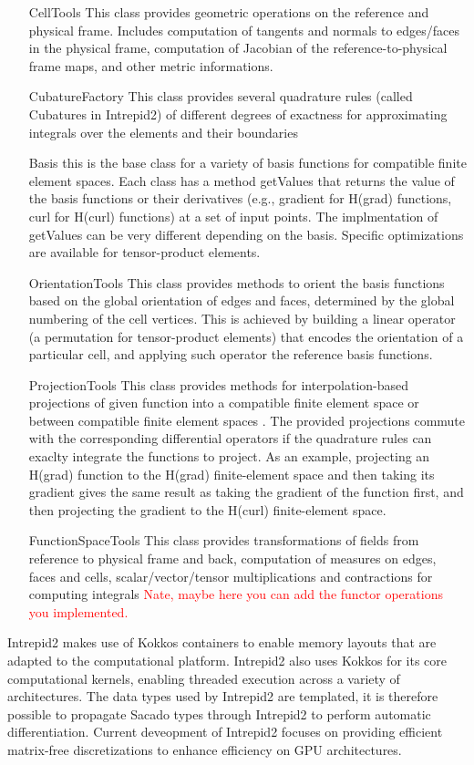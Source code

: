 \begin{itemize}
\item[CellTools] This class provides geometric operations on the reference and physical frame. Includes computation of tangents and normals to edges/faces in the physical frame, computation of Jacobian of the reference-to-physical frame maps, and other metric informations. 
\item[CubatureFactory] This class provides several quadrature rules (called Cubatures in Intrepid2) of different degrees of exactness for approximating integrals over the elements and their boundaries
\item[Basis] this is the base class for a variety of basis functions for compatible finite element spaces. Each class has a method getValues that returns the value of the basis functions or their derivatives (e.g., gradient for H(grad) functions, curl for H(curl) functions) at a set of input  points. The implmentation of getValues can be very different depending on the basis. Specific optimizations are available for tensor-product elements.
\item[OrientationTools] This class provides methods to orient the basis functions based on the global orientation of edges and faces, determined by the global numbering of the cell vertices. This is achieved by building a linear operator (a permutation for tensor-product elements) that encodes the orientation of a particular cell, and applying such operator the reference basis functions.
\item[ProjectionTools] This class provides methods for interpolation-based projections of given function into a compatible finite element space or between compatible finite element spaces \cite{demkowicz2007}.  The provided projections commute with the corresponding differential operators if the quadrature rules can exaclty integrate the functions to project. As an example, projecting an H(grad) function to the H(grad) finite-element space and then taking its gradient gives the same result as taking the gradient of the function first, and then projecting the gradient to the H(curl) finite-element space.
\item[FunctionSpaceTools] This class provides transformations of fields from reference to physical frame and back, computation of measures on edges, faces and cells, scalar/vector/tensor multiplications and contractions for computing integrals \textcolor{red}{Nate, maybe here you can add the functor operations you implemented.}
\end{itemize}
Intrepid2 makes use of Kokkos containers to enable memory layouts that are adapted to the computational platform. Intrepid2 also uses Kokkos for its core computational kernels, enabling threaded execution across a variety of architectures. The data types used by Intrepid2 are templated, it is therefore possible to propagate Sacado types through Intrepid2 to perform automatic differentiation. Current deveopment of Intrepid2 focuses on providing efficient matrix-free discretizations to enhance efficiency on GPU architectures. 

